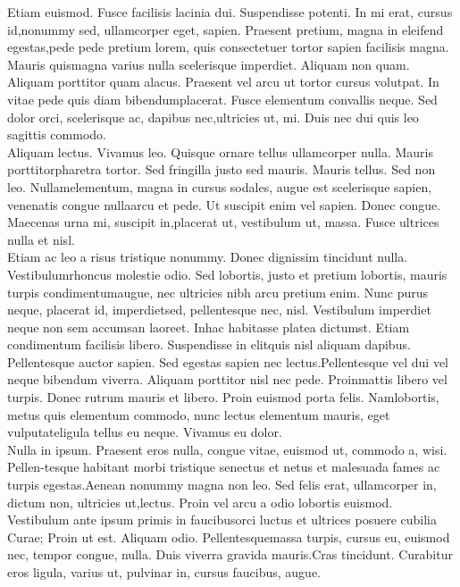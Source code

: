 \documentclass[11pt,
               a4paper,
               parskip=half,
               ]{scrartcl}
\begin{document}
 Etiam euismod. Fusce facilisis lacinia dui. Suspendisse potenti. In mi erat, cursus id,nonummy sed, ullamcorper eget, sapien. Praesent pretium, magna in eleifend egestas,pede pede pretium lorem, quis consectetuer tortor sapien facilisis magna. Mauris quismagna varius nulla scelerisque imperdiet. Aliquam non quam. Aliquam porttitor quam alacus. Praesent vel arcu ut tortor cursus volutpat. In vitae pede quis diam bibendumplacerat. Fusce elementum convallis neque. Sed dolor orci, scelerisque ac, dapibus nec,ultricies ut, mi. Duis nec dui quis leo sagittis commodo.\\
 
 Aliquam lectus. Vivamus leo. Quisque ornare tellus ullamcorper nulla. Mauris porttitorpharetra tortor. Sed fringilla justo sed mauris. Mauris tellus. Sed non leo. Nullamelementum, magna in cursus sodales, augue est scelerisque sapien, venenatis congue nullaarcu et pede. Ut suscipit enim vel sapien. Donec congue. Maecenas urna mi, suscipit in,placerat ut, vestibulum ut, massa. Fusce ultrices nulla et nisl.\\
 
 Etiam ac leo a risus tristique nonummy. Donec dignissim tincidunt nulla. Vestibulumrhoncus molestie odio. Sed lobortis, justo et pretium lobortis, mauris turpis condimentumaugue, nec ultricies nibh arcu pretium enim. Nunc purus neque, placerat id, imperdietsed, pellentesque nec, nisl. Vestibulum imperdiet neque non sem accumsan laoreet. Inhac habitasse platea dictumst. Etiam condimentum facilisis libero. Suspendisse in elitquis nisl aliquam dapibus. Pellentesque auctor sapien. Sed egestas sapien nec lectus.Pellentesque vel dui vel neque bibendum viverra. Aliquam porttitor nisl nec pede. Proinmattis libero vel turpis. Donec rutrum mauris et libero. Proin euismod porta felis. Namlobortis, metus quis elementum commodo, nunc lectus elementum mauris, eget vulputateligula tellus eu neque. Vivamus eu dolor.\\
 
 Nulla in ipsum. Praesent eros nulla, congue vitae, euismod ut, commodo a, wisi. Pellen-tesque habitant morbi tristique senectus et netus et malesuada fames ac turpis egestas.Aenean nonummy magna non leo. Sed felis erat, ullamcorper in, dictum non, ultricies ut,lectus. Proin vel arcu a odio lobortis euismod. Vestibulum ante ipsum primis in faucibusorci luctus et ultrices posuere cubilia Curae; Proin ut est. Aliquam odio. Pellentesquemassa turpis, cursus eu, euismod nec, tempor congue, nulla. Duis viverra gravida mauris.Cras tincidunt. Curabitur eros ligula, varius ut, pulvinar in, cursus faucibus, augue.\\
 
\end{document}
